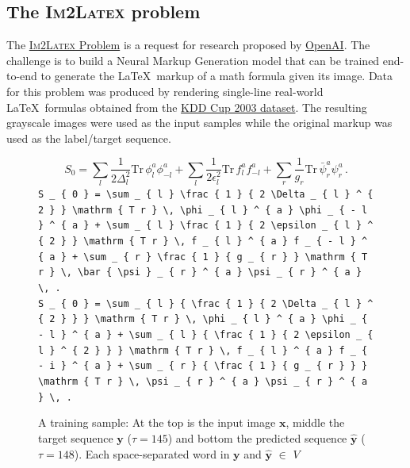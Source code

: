 \documentclass{article}
\begin{document}
\subsection{The \textsc{Im2Latex} problem}
\label{the_problem}
The \href{https://openai.com/requests-for-research/#im2latex}{\textsc{Im2Latex} Problem} is a request for research
proposed by \href{https://openai.com}{OpenAI}. The challenge is to build a Neural Markup
Generation model that can be trained end-to-end to generate the \LaTeX ~markup of a math formula given its image.
Data for this problem %
was produced by rendering single-line real-world \LaTeX  ~formulas obtained from the \href{http://www.cs.cornell.edu/projects/kddcup/datasets.html}{KDD Cup 2003 dataset}. The resulting grayscale images were used as the input samples while the original markup was used as the label/target sequence.
\lstset{basicstyle=\tiny}
\begin{figure}[!h]
	\begin{displaymath}
	S _ { 0 } = \sum _ { l } \frac { 1 } { 2 \Delta _ { l } ^ { 2 } } \mathrm { T r } \, \phi _ { l } ^ { a } \phi _ { - l } ^ { a } + \sum _ { l } \frac { 1 } { 2 \epsilon _ { l } ^ { 2 } } \mathrm { T r } \, f _ { l } ^ { a } f _ { - l } ^ { a } + \sum _ { r } \frac { 1 } { g _ { r } } \mathrm { T r } \, \bar { \psi } _ { r } ^ { a } \psi _ { r } ^ { a } \, .
	\end{displaymath}
	\lstinline|S _ { 0 } = \sum _ { l } \frac { 1 } { 2 \Delta _ { l } ^ { 2 } } \mathrm { T r } \, \phi _ { l } ^ { a } \phi _ { - l } ^ { a } + \sum _ { l } \frac { 1 } { 2 \epsilon _ { l } ^ { 2 } } \mathrm { T r } \, f _ { l } ^ { a } f _ { - l } ^ { a } + \sum _ { r } \frac { 1 } { g _ { r } } \mathrm { T r } \, \bar { \psi } _ { r } ^ { a } \psi _ { r } ^ { a } \, .| \\
		
	\lstinline|S _ { 0 } = \sum _ { l } { \frac { 1 } { 2 \Delta _ { l } ^ { 2 } } } \mathrm { T r } \, \phi _ { l } ^ { a } \phi _ { - l } ^ { a } + \sum _ { l } { \frac { 1 } { 2 \epsilon _ { l } ^ { 2 } } } \mathrm { T r } \, f _ { l } ^ { a } f _ { - i } ^ { a } + \sum _ { r } { \frac { 1 } { g _ { r } } } \mathrm { T r } \, \psi _ { r } ^ { a } \psi _ { r } ^ { a } \, .|
	\caption{A training sample: At the top is the input image $\boldsymbol{x}$, middle the target sequence $\boldsymbol{y}$ ($\tau = 145$) and bottom the predicted sequence $\boldsymbol{\hat{y}}$ (${\tau} = 148$). Each space-separated word in $\boldsymbol{y}$ and $\boldsymbol{\hat{y}}$ $\in$ $V$ }
	\label{fig-sample}
\end{figure}
\end{document}

